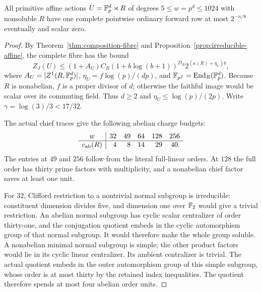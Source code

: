 \begin{theorem}
\label{thm:nonsoluble-primitive-consumer}
All primitive affine actions $U=\mathbb F_p^d\rtimes R$ of degrees
$5\leq w=p^d\leq1024$ with nonsoluble $R$ have one complete
pointwise ordinary forward row at most $2^{-n/8}$ eventually
and scalar zero.
\end{theorem}
\begin{proof}
By Theorem~\ref{thm:composition-fibre} and
Proposition~\ref{prop:irreducible-affine}, the complete fibre
has the bound
\[
 Z_J(U)\leq(1+A_U)C_R(1+b\log(b+1))^{D_R}
              2^{(\kappa(R)+\eta_U)b},
\]
where $A_U=|Z^1(R,\mathbb F_p^d)|$,
$\eta_U=f\log(p)/(dp)$, and $\mathbb F_{p^f}=\operatorname{End}_R(\mathbb F_p^d)$.
Because $R$ is nonabelian, $f$ is a proper divisor of $d$;
otherwise the faithful image would be scalar over its commuting
field. Thus $d\geq2$ and $\eta_U\leq\log(p)/(2p)$.
Write $\gamma=\log(3)/3<17/32$.

The actual chief traces give the following abelian charge budgets:
\[
\begin{array}{c|rrrrr}
 w&32&49&64&128&256\\\hline
 c_{\rm ab}(R)&4&8&14&29&40.
\end{array}
\]
The entries at $49$ and $256$ follow from the literal full-linear
orders. At $128$ the full order has thirty prime factors with
multiplicity, and a nonabelian chief factor saves at least one unit.

For $32$, Clifford restriction to a nontrivial normal subgroup is
irreducible: constituent dimension divides five, and dimension one over
$\mathbb F_2$ would give a trivial restriction. An abelian normal subgroup
has cyclic scalar centralizer of order thirty-one, and the conjugation quotient embeds in the cyclic automorphism group of that normal subgroup. It would therefore make the whole group soluble. A nonabelian minimal normal
subgroup is simple; the other product factors would lie in its cyclic
linear centralizer. Its ambient centralizer is trivial. The actual
quotient embeds in the outer automorphism group of this simple subgroup,
whose order is at most thirty by the retained index inequalities.
The quotient therefore spends at most four abelian order units.


\end{proof}

